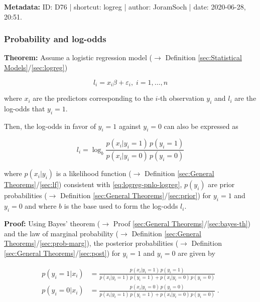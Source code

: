 \documentclass[a4paper,12pt,twoside]{book}
\begin{document}
\vspace{1em}
\textbf{Metadata:} ID: D76 | shortcut: logreg | author: JoramSoch | date: 2020-06-28, 20:51.
\vspace{1em}



\subsubsection[\textbf{Probability and log-odds}]{Probability and log-odds} \label{sec:logreg-pnlo}
\setcounter{equation}{0}

\textbf{Theorem:} Assume a logistic regression model ($\rightarrow$ Definition \ref{sec:Statistical Models}/\ref{sec:logreg})

\begin{equation} \label{eq:logreg-pnlo-logreg}
l_i = x_i \beta + \varepsilon_i, \; i = 1,\ldots,n
\end{equation}

where $x_i$ are the predictors corresponding to the $i$-th observation $y_i$ and $l_i$ are the log-odds that $y_i = 1$.

Then, the log-odds in favor of $y_i = 1$ against $y_i = 0$ can also be expressed as

\begin{equation} \label{eq:logreg-pnlo-lodds}
l_i = \log_b \frac{p(x_i|y_i=1) \, p(y_i=1)}{p(x_i|y_i=0) \, p(y_i=0)}
\end{equation}

where $p(x_i \vert y_i)$ is a likelihood function ($\rightarrow$ Definition \ref{sec:General Theorems}/\ref{sec:lf}) consistent with \eqref{eq:logreg-pnlo-logreg}, $p(y_i)$ are prior probabilities ($\rightarrow$ Definition \ref{sec:General Theorems}/\ref{sec:prior}) for $y_i = 1$ and $y_i = 0$ and where $b$ is the base used to form the log-odds $l_i$.


\vspace{1em}
\textbf{Proof:} Using Bayes' theorem ($\rightarrow$ Proof \ref{sec:General Theorems}/\ref{sec:bayes-th}) and the law of marginal probability ($\rightarrow$ Definition \ref{sec:General Theorems}/\ref{sec:prob-marg}), the posterior probabilities ($\rightarrow$ Definition \ref{sec:General Theorems}/\ref{sec:post}) for $y_i = 1$ and $y_i = 0$ are given by

\begin{equation} \label{eq:logreg-pnlo-prob}
\begin{split}
p(y_i=1|x_i) &= \frac{p(x_i|y_i=1) \, p(y_i=1)}{p(x_i|y_i=1) \, p(y_i=1) + p(x_i|y_i=0) \, p(y_i=0)} \\
p(y_i=0|x_i) &= \frac{p(x_i|y_i=0) \, p(y_i=0)}{p(x_i|y_i=1) \, p(y_i=1) + p(x_i|y_i=0) \, p(y_i=0)} \; .
\end{split}
\end{equation}
\end{document}
